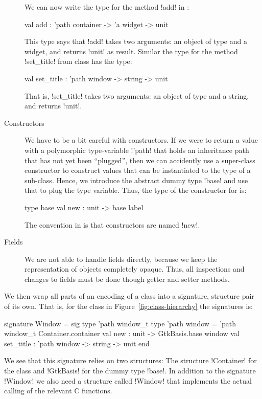\documentclass[workingdraft]{usetex-v1}
\begin{document}
\begin{description}
  We can now write the type for the method !add! in
  :
\begin{SMLcode}
val add : 'path container -> 'a widget 
                               -> unit
\end{SMLcode}
This type says that !add! takes two arguments: an object of type
 and a widget, and returns !unit! as result.
Similar the type for the method !set_title! from class
 has the type:
\begin{SMLcode}
val set_title : 'path window -> string 
                               -> unit
\end{SMLcode}
That is, !set_title! takes two arguments: an object of type 
 and a string, and returns !unit!.


\item[Constructors] We have to be a bit careful with constructors.  If
  we were to return a value with a polymorphic type-variable !'path!
  that holds an inheritance path that has not yet been ``plugged'',
  then we can accidently use a super-class constructor to construct
  values that can be instantiated to the type of a sub-class.  Hence,
  we introduce the abstract dummy type !base! and use that to plug the
  type variable.  Thus, the type of the constructor for
   is:
\begin{SMLcode}
type base
val new : unit -> base label
\end{SMLcode}
The convention in \gtk is that constructors are named !new!.

\item[Fields] We are not able to handle fields directly, because we
  keep the representation of objects completely opaque.  Thus, all
  inspections and changes to fields must be done though getter and
  setter methods.

\end{description}

We then wrap all parts of an encoding of a class into a signature,
structure pair of its own.  That is, for the class 
in Figure~\ref{fig:class-hierarchy} the \sml signatures is:
\begin{SMLcode}
signature Window =
sig
  type 'path window_t
  type 'path window = 
         'path window_t Container.container
  val new : unit 
            -> GtkBasis.base window
  val set_title : 'path window -> string 
                                 -> unit
end
\end{SMLcode}
We see that this signature relies on two structures: The structure
!Container! for the class  and !GtkBasis! for the dummy
type !base!.  In addition to the signature !Window! we also need a
structure called !Window! that implements the actual calling of the
relevant \gtk C functions.
\end{document}
